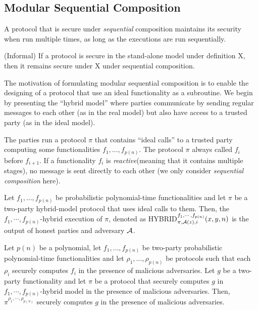 \subsection{Modular Sequential Composition}
A protocol that is secure under {\it sequential} composition maintains its security when run multiple times, as long as the executions are run sequentially.
\begin{theorem}(Informal) If a protocol is secure in the stand-alone model under definition X, then it remains secure under X under sequential composition.
\end{theorem}
\begin{description}[leftmargin=0em]
\item[Modular sequential composition.] The motivation of formulating modular sequential composition is to enable the designing of a protocol that use an ideal functionality as a subroutine. We begin by presenting the ``hybrid model'' where parties communicate by sending regular messages to each other (as in the real model) but also have access to a trusted party (as in the ideal model).
\item[The hybrid model.] The parties run a protocol $\pi$ that contains ``ideal calls'' to a trusted party computing some functionalities $f_1,\ldots,f_{p(n)}$. The protocol $\pi$ always called $f_i$ before $f_{i+1}$. If a functionality $f_i$ is {\it reactive}(meaning that it contains multiple stages), no message is sent directly to each other (we only consider {\it sequential composition} here).
\item[Sequential composition-malicious adversaries] Let $f_1,\ldots,f_{p(n)}$ be probabilistic polynomial-time functionalities and let $\pi$ be a two-party hybrid-model protocol that uses ideal calls to them. Then, the $f_1,\cdots,f_{p(n)}$-{\sf hybrid execution of }$\pi$, denoted as {\sf HYBRID}$^{f_1,\cdots,f_{p(n)}}_{\pi,\mathcal{A}(z),i}(x,y,n)$ is the output of honest parties and adversary $\mathcal{A}$.
\end{description}
\begin{theorem} Let $p(n)$ be a polynomial, let $f_1,\ldots,f_{p(n)}$ be two-party probabilistic polynomial-time functionalities and let $\rho_1,\ldots,\rho_{p(n)}$ be protocols such that each $\rho_i$ securely computes $f_i$ in the presence of malicious adversaries. Let $g$ be a two-party functionality and let $\pi$ be a protocol that securely computes $g$ in $f_1,\cdots,f_{p(n)}$-{\sf hybrid model} in the presence of malicious adversaries. Then, $\pi^{\rho_1,\cdots,\rho_{p(n)}}$ securely computes $g$ in the presence of malicious adversaries.
\end{theorem}
